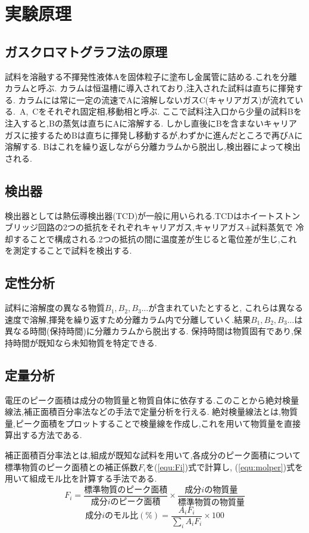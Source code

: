 \section{実験原理}
\subsection{ガスクロマトグラフ法の原理}
試料を溶融する不揮発性液体Aを固体粒子に塗布し金属管に詰める.これを分離カラムと呼ぶ.
カラムは恒温槽に導入されており,注入された試料は直ちに揮発する.
カラムには常に一定の流速でAに溶解しないガスC(キャリアガス)が流れている.\ A,\ Cをそれぞれ固定相,移動相と呼ぶ.
ここで試料注入口から少量の試料Bを注入すると,Bの蒸気は直ちにAに溶解する.
しかし直後にBを含まないキャリアガスに接するためBは直ちに揮発し移動するが,わずかに進んだところで再びAに溶解する.
Bはこれを繰り返しながら分離カラムから脱出し,検出器によって検出される.
\subsection{検出器}
検出器としては熱伝導検出器(TCD)が一般に用いられる.TCDはホイートストンブリッジ回路の2つの抵抗をそれぞれキャリアガス,キャリアガス+試料蒸気で
冷却することで構成される.2つの抵抗の間に温度差が生じると電位差が生じ,これを測定することで試料を検出する.
\subsection{定性分析}
試料に溶解度の異なる物質$B_1,B_2,B_3...$が含まれていたとすると,
これらは異なる速度で溶解,揮発を繰り返すため分離カラム内で分離していく.結果$B_1,B_2,B_3...$は異なる時間(保持時間)に分離カラムから脱出する.
保持時間は物質固有であり,保持時間が既知なら未知物質を特定できる.
\subsection{定量分析}
電圧のピーク面積は成分の物質量と物質自体に依存する.このことから絶対検量線法,補正面積百分率法などの手法で定量分析を行える.
絶対検量線法とは,物質量,ピーク面積をプロットすることで検量線を作成し,これを用いて物質量を直接算出する方法である.

補正面積百分率法とは,組成が既知な試料を用いて,各成分のピーク面積について標準物質のピーク面積との補正係数$F_i$を(\ref{equ:Fi})式で計算し\cite{rikougaku},
(\ref{equ:molper})式を用いて組成モル比を計算する手法である.
\begin{equation}
  \label{equ:Fi}
  F_i=\frac{標準物質のピーク面積}{成分iのピーク面積}\times\frac{成分iの物質量}{標準物質の物質量}
\end{equation}
\begin{equation}
  \label{equ:molper}
  成分iのモル比(\%)=\frac{A_i F_i}{\sum_i A_i F_i}\times100
\end{equation}